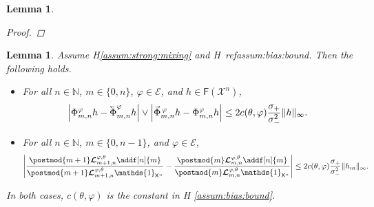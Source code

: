 \documentclass{article}
\newtheorem{lemma}[theorem]{Lemma}
\newcommand{\precparsp}{\mathcal{E}}
\newcommand{\Xfd}{\mathcal{X}}
\newcommand{\cev}[1]{\reflectbox{\ensuremath{\vec{\reflectbox{\ensuremath{#1}}}}}}
\newcommand{\shiftbwd}{\cev{\shiftsymbol}^{\precpar}}
\newcommand{\shiftfwd}{\vec{\shiftsymbol}^{\, \precpar}}
\newcommand{\shiftsymbol}{\Phi}
\newcommand{\precpar}{\varphi}
\newcommand{\intvect}[2]{\{ #1, #2 \}}
\newcommand{\noshift}{\shiftsymbol^{\precpar}}
\newcommand{\udlow}{\sigma_-}
\newcommand{\udup}{\sigma_+}
\newcommand{\nset}{\mathbb{N}}
\newcommand{\1}{\mathbbm{1}}
\newcommand{\retrokmod}{\boldsymbol{\mathcal{L}}^{\precpar,\theta}}
\newcommand{\Xset}{\mathsf{X}}
\newcommand{\bmf}[1]{\set{F}(#1)}
\newcommand{\set}[1]{\mathsf{#1}}
\def\1{\mathds{1}}
\newcommand{\eqdef}{\ensuremath{:=}}
\begin{document}
\begin{lemma}
\begin{proof}
\end{proof}
\end{lemma}

\begin{lemma} \label{lem:diff:bound} 
Assume H\ref{assum:strong:mixing} and H\
ref{assum:bias:bound}. Then the following holds. 
\begin{itemize}
\item[(i)] For all $n \in \nset$, $m \in \intvect{0}{n}$, $\precpar \in \precparsp$, and $h \in \bmf{\Xfd^n}$,   
$$
\left| \noshift_{m, n} h - \shiftbwd_{m, n} h \right| \vee \left| \shiftfwd_{m, n} h - \noshift_{m, n} h \right| \leq 2 c(\theta,\varphi)  \frac{\udup}{\udlow^2} \| h \|_\infty.   
$$
\item[(ii)] For all $n \in \nset$, $m \in \intvect{0}{n - 1}$, and $\precpar \in \precparsp$,
$$
\left| \frac{\postmod{m + 1} \retrokmod_{m + 1, n} \addf[n]{m}}{\postmod{m + 1} \retrokmod_{m + 1, n} \1_{\Xset^n}} - \frac{\postmod{m} \retrokmod_{m, n} \addf[n]{m}}{\postmod{m} \retrokmod_{m, n} \1_{\Xset^n}} \right| \leq 2 c(\theta,\varphi)  \frac{\udup}{\udlow^2} \| h_m \|_\infty. 
$$
\end{itemize}
In both cases, $c(\theta,\varphi)$ is the constant in H
\ref{assum:bias:bound}. 
\end{lemma}
\end{document}

